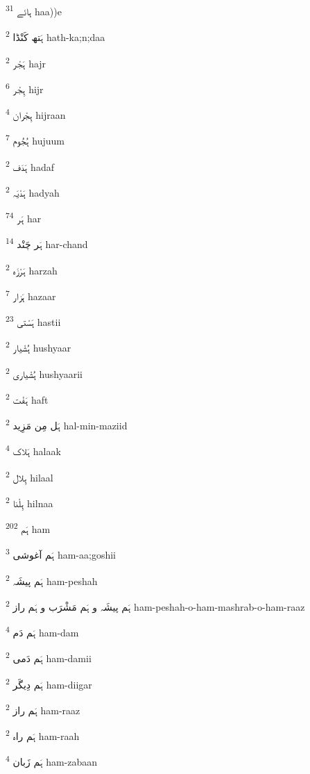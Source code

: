 \documentclass[12pt]{article}
\begin{document}
\begin{RTL}
\begin{multicols}{5}
{\ur ہائے}   \textsuperscript{31} haa))e

{\ur ہَتھ کَنْڈا}   \textsuperscript{2} hath-ka;n;daa

{\ur ہَجْر}   \textsuperscript{2} hajr

{\ur ہِجْر}   \textsuperscript{6} hijr

{\ur ہِجْران}   \textsuperscript{4} hijraan

{\ur ہُجُوم}   \textsuperscript{7} hujuum

{\ur ہَدَف}   \textsuperscript{2} hadaf

{\ur ہَدْیَہ}   \textsuperscript{2} hadyah

{\ur ہَر}   \textsuperscript{74} har

{\ur ہَر چَنْد}   \textsuperscript{14} har-chand

{\ur ہَرْزَہ}   \textsuperscript{2} harzah

{\ur ہَزار}   \textsuperscript{7} hazaar

{\ur ہَسْتی}   \textsuperscript{23} hastii

{\ur ہُشْیار}   \textsuperscript{2} hushyaar

{\ur ہُشْیاری}   \textsuperscript{2} hushyaarii

{\ur ہَفْت}   \textsuperscript{2} haft

{\ur ہَل مِن مَزِید}   \textsuperscript{2} hal-min-maziid

{\ur ہَلاک}   \textsuperscript{4} halaak

{\ur ہِلال}   \textsuperscript{2} hilaal

{\ur ہِلْنا}   \textsuperscript{2} hilnaa

{\ur ہَم}   \textsuperscript{202} ham

{\ur ہَم آغوشی}   \textsuperscript{3} ham-aa;goshii

{\ur ہَم پیشَہ}   \textsuperscript{2} ham-peshah

{\ur ہَم پیشَہ و ہَم مَشْرَب و ہَم راز}   \textsuperscript{2} ham-peshah-o-ham-mashrab-o-ham-raaz

{\ur ہَم دَم}   \textsuperscript{4} ham-dam

{\ur ہَم دَمی}   \textsuperscript{2} ham-damii

{\ur ہَم دِیگَر}   \textsuperscript{2} ham-diigar

{\ur ہَم راز}   \textsuperscript{2} ham-raaz

{\ur ہَم راہ}   \textsuperscript{2} ham-raah

{\ur ہَم زَبان}   \textsuperscript{4} ham-zabaan


\end{multicols}
\end{RTL}
\end{document}

